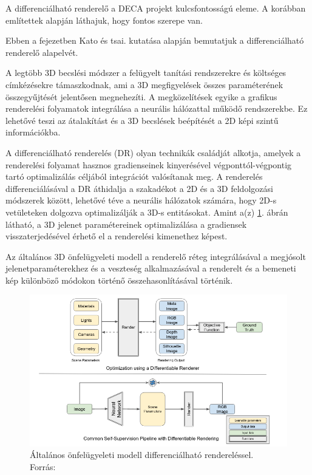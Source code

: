 \documentclass[12pt,a4]{article}
\begin{document}
                A differenciálható renderelő a DECA projekt kulcsfontosságú eleme. A korábban említettek alapján láthajuk, hogy fontos szerepe van.

                 Ebben a fejezetben \cite{diffrenderer}Kato és tsai. kutatása alapján bemutatjuk a differenciálható renderelő alapelvét.

                A legtöbb 3D becslési módszer a felügyelt tanítási rendszerekre és költséges címkézésekre támaszkodnak, ami
                a 3D megfigyelések összes paraméterének összegyűjtését jelentősen megnehezíti. A megközelítések egyike a grafikus renderelési folyamatok integrálása a neurális hálózattal működő rendszerekbe. Ez lehetővé teszi az átalakítást és a 3D becslések beépítését a 2D képi szintű információkba.

                A differenciálható renderelés (DR) olyan technikák családját alkotja, amelyek a renderelési folyamat hasznos gradienseinek kinyerésével végponttól-végpontig tartó optimalizálás céljából integrációt valósítanak meg. A renderelés differenciálásával a DR áthidalja a szakadékot
                a 2D és a 3D feldolgozási módszerek között, lehetővé téve a neurális hálózatok számára, hogy 2D-s vetületeken dolgozva optimalizálják a 3D-s entitásokat. Amint a(z) \ref{fig:diffrenderer}. ábrán látható, a 3D jelenet paramétereinek optimalizálása a gradiensek visszaterjedésével érhető el a renderelési kimenethez képest. 

                Az általános 3D önfelügyeleti modell a renderelő réteg integrálásával a megjósolt jelenetparaméterekhez és a veszteség alkalmazásával a renderelt és a bemeneti kép különböző módokon történő összehasonlításával történik.

                \begin{figure}[h!]	
            		\centering
            		\includegraphics[width=1\linewidth]{diffrenderer}
            		\caption{Általános önfelügyeleti modell differenciálható rendereléssel.\\
                            Forrás: \cite{diffrenderer}}
                    \label{fig:diffrenderer}
            	\end{figure}
\end{document}
